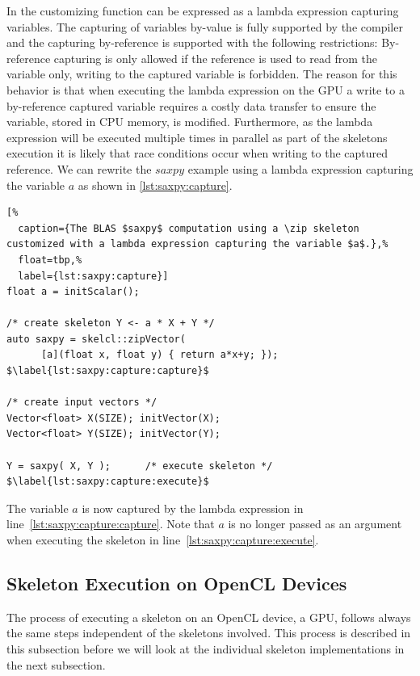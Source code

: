 In \SkelCL the customizing function can be expressed as a lambda expression capturing variables.
The capturing of variables by-value is fully supported by the  compiler and the capturing by-reference is supported with the following restrictions:
By-reference capturing is only allowed if the reference is used to read from the variable only, writing to the captured variable is forbidden.
The reason for this behavior is that when executing the lambda expression on the GPU a write to a by-reference captured variable requires a costly data transfer to ensure the variable, stored in CPU memory, is modified.
Furthermore, as the lambda expression will be executed multiple times in parallel as part of the skeletons execution it is likely that race conditions occur when writing to the captured reference.
We can rewrite the $saxpy$ example using a lambda expression capturing the variable $a$ as shown in \autoref{lst:saxpy:capture}.
\begin{lstlisting}[%
  caption={The BLAS $saxpy$ computation using a \zip skeleton customized with a lambda expression capturing the variable $a$.},%
  float=tbp,%
  label={lst:saxpy:capture}]
float a = initScalar();

/* create skeleton Y <- a * X + Y */
auto saxpy = skelcl::zipVector(
      [a](float x, float y) { return a*x+y; }); $\label{lst:saxpy:capture:capture}$

/* create input vectors */
Vector<float> X(SIZE); initVector(X);
Vector<float> Y(SIZE); initVector(Y);

Y = saxpy( X, Y );      /* execute skeleton */ $\label{lst:saxpy:capture:execute}$
\end{lstlisting}

The variable $a$ is now captured by the lambda expression in line~\ref{lst:saxpy:capture:capture}.
Note that $a$ is no longer passed as an argument when executing the skeleton in line~\ref{lst:saxpy:capture:execute}.












\subsection{Skeleton Execution on OpenCL Devices}
\label{section:skelcl-library:execution}
The process of executing a skeleton on an OpenCL device, \eg a GPU, follows always the same steps independent of the skeletons involved.
This process is described in this subsection before we will look at the individual skeleton implementations in the next subsection.

